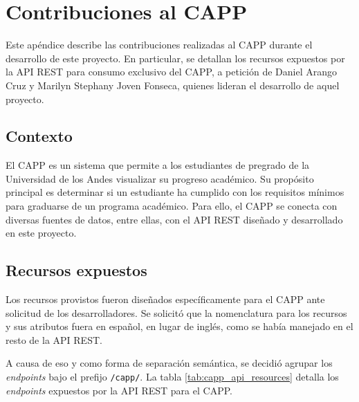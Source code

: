 \chapter{Contribuciones al CAPP}

Este apéndice describe las contribuciones realizadas al \gls{CAPP} durante el desarrollo de este proyecto. En particular, se detallan los recursos expuestos por la \gls{API REST} para consumo exclusivo del \gls{CAPP}, a petición de Daniel Arango Cruz y Marilyn Stephany Joven Fonseca, quienes lideran el desarrollo de aquel proyecto.

\section{Contexto}

El \gls{CAPP} es un sistema que permite a los estudiantes de pregrado de la Universidad de los Andes visualizar su progreso académico. Su propósito principal es determinar si un estudiante ha cumplido con los requisitos mínimos para graduarse de un programa académico. Para ello, el \gls{CAPP} se conecta con diversas fuentes de datos, entre ellas, con el \gls{API REST} diseñado y desarrollado en este proyecto.

\section{Recursos expuestos}

Los recursos provistos fueron diseñados específicamente para el \gls{CAPP} ante solicitud de los desarrolladores. Se solicitó que la nomenclatura para los recursos y sus atributos fuera en español, en lugar de inglés, como se había manejado en el resto de la \gls{API REST}.

A causa de eso y como forma de separación semántica, se decidió agrupar los \textit{endpoints} bajo el prefijo \texttt{/capp/}. La tabla \ref{tab:capp_api_resources} detalla los \textit{endpoints} expuestos por la \gls{API REST} para el \gls{CAPP}.

